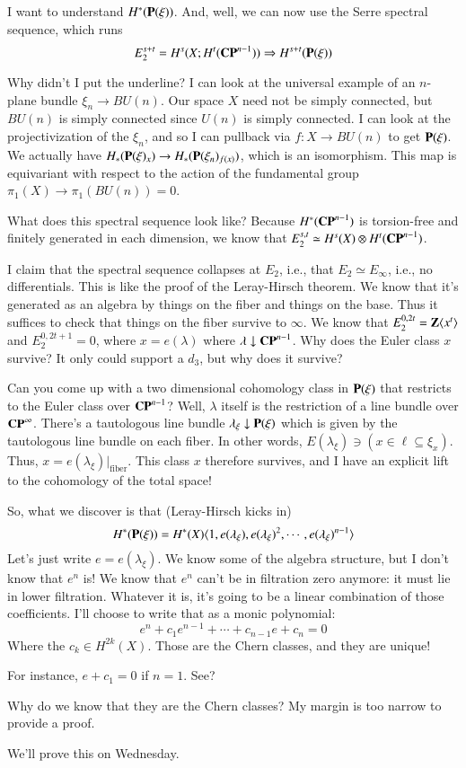 I want to understand $H^\ast(\mathbf P(\xi))$.
And, well, we can now use the Serre spectral sequence, which runs
$$
E_2^{s+t} = H^s(X; H^t(\mathbf{CP}^{n-1})) \Rightarrow H^{s+t}(\mathbf P(\xi))
$$
\begin{remark}
Why didn't I put the underline?
I can look at the universal example of an $n$-plane bundle $\xi_n\to BU(n)$.
Our space $X$ need not be simply connected, but $BU(n)$ is simply connected since $U(n)$ is simply connected.
I can look at the projectivization of the $\xi_n$, and so I can pullback via $f:X\to BU(n)$ to get $\mathbf P(\xi)$.
We actually have $H_\ast(\mathbf P(\xi)_x) \to H_\ast(\mathbf P(\xi_n)_{f(x)})$, which is an isomorphism.
This map is equivariant with respect to the action of the fundamental group $\pi_1 (X) \to \pi_1(BU(n)) = 0$.
\end{remark}
What does this spectral sequence look like?
Because $H^\ast(\mathbf{CP}^{n-1})$ is torsion-free and finitely generated in each dimension, we know that $E_2^{s,t} \simeq H^s(X) \otimes H^t(\mathbf{CP}^{n-1})$.

I claim that the spectral sequence collapses at $E_2$, i.e., that $E_2 \simeq E_\infty$, i.e., no differentials.
This is like the proof of the Leray-Hirsch theorem.
We know that it's generated as an algebra by things on the fiber and things on the base.
Thus it suffices to check that things on the fiber survive to $\infty$.
We know that $E_2^{0,2t} = \mathbf Z\langle x^t\rangle$ and $E_2^{0,2t+1} = 0$, where $x = e(\lambda)$ where $\lambda\downarrow\mathbf{CP}^{n-1}$.
Why does the Euler class $x$ survive?
It only could support a $d_3$, but why does it survive?

Can you come up with a two dimensional cohomology class in $\mathbf P(\xi)$ that restricts to the Euler class over $\mathbf{CP}^{n-1}$?
Well, $\lambda$ itself is the restriction of a line bundle over $\mathbf{CP}^\infty$.
There's a tautologous line bundle $\lambda_\xi \downarrow \mathbf P(\xi)$ which is given by the tautologous line bundle on each fiber.
In other words, $E(\lambda_\xi)\ni(x\in \ell\subseteq\xi_x)$.
Thus, $x = e(\lambda_\xi)|_\text{fiber}$.
This class $x$ therefore survives, and I have an explicit lift to the cohomology of the total space!

So, what we discover is that (Leray-Hirsch kicks in)
$$
H^\ast(\mathbf P(\xi)) = H^\ast(X)\langle 1, e(\lambda_\xi), e(\lambda_\xi)^2, \cdots, e(\lambda_\xi)^{n-1}\rangle
$$
Let's just write $e = e(\lambda_\xi)$.
We know some of the algebra structure, but I don't know that $e^n$ is!
We know that $e^n$ can't be in filtration zero anymore: it must lie in lower filtration.
Whatever it is, it's going to be a linear combination of those coefficients.
I'll choose to write that as a monic polynomial:
$$
e^n + c_1e^{n-1} + \cdots + c_{n-1} e + c_n = 0
$$
Where the $c_k \in H^{2k}(X)$.
Those are the Chern classes, and they are unique!

For instance, $e+c_1 = 0$ if $n=1$. See?

\begin{question}
    Why do we know that they are the Chern classes?
    My margin is too narrow to provide a proof.
\end{question}
We'll prove this on Wednesday.
